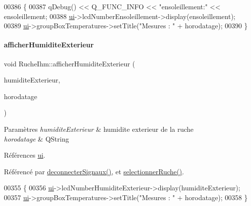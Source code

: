 \begin{DoxyCode}
00386 \{
00387    qDebug() << Q\_FUNC\_INFO << \textcolor{stringliteral}{"ensoleillement:"} << ensoleillement;
00388    \hyperlink{class_ruche_ihm_a64786058bd7f88ca2f1e9743bb27c25b}{ui}->lcdNumberEnsoleillement->display(ensoleillement);
00389    \hyperlink{class_ruche_ihm_a64786058bd7f88ca2f1e9743bb27c25b}{ui}->groupBoxTemperatures->setTitle(\textcolor{stringliteral}{"Mesures : "} + horodatage);
00390 \}
\end{DoxyCode}
\mbox{\label{class_ruche_ihm_a6381018a7dc88cb966d7bbc49515495e}} 
\paragraph{\texorpdfstring{afficher\+Humidite\+Exterieur}{afficherHumiditeExterieur}}
{\footnotesize\ttfamily void Ruche\+Ihm\+::afficher\+Humidite\+Exterieur (\begin{DoxyParamCaption}\item[{double}]{humidite\+Exterieur,  }\item[{Q\+String}]{horodatage }\end{DoxyParamCaption})\hspace{0.3cm}{\ttfamily [slot]}}


\begin{DoxyParams}{Paramètres}
{\em humidite\+Exterieur} & humidite exterieur de la ruche \\
\hline
{\em horodatage} & Q\+String \\
\hline
\end{DoxyParams}


Références \hyperlink{class_ruche_ihm_a64786058bd7f88ca2f1e9743bb27c25b}{ui}.



Référencé par \hyperlink{class_ruche_ihm_a348a76106f3072dd31a382c6025b8113}{deconnecter\+Signaux()}, et \hyperlink{class_ruche_ihm_a7324ae6ea574ccdad47783f466933157}{selectionner\+Ruche()}.


\begin{DoxyCode}
00355 \{
00356     \hyperlink{class_ruche_ihm_a64786058bd7f88ca2f1e9743bb27c25b}{ui}->lcdNumberHumiditeExterieur->display(humiditeExterieur);
00357     \hyperlink{class_ruche_ihm_a64786058bd7f88ca2f1e9743bb27c25b}{ui}->groupBoxTemperatures->setTitle(\textcolor{stringliteral}{"Mesures : "} + horodatage);
00358 \}
\end{DoxyCode}
\mbox{\label{class_ruche_ihm_a4ab4b1ba1618a9aaf5bdb7f51df987aa}} 

